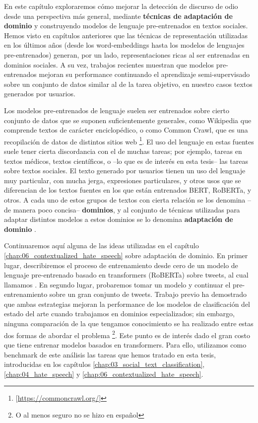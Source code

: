\label{chap:07_domain_adaptation}
\newcommand{\deacc}[0]{\textbf{deacc}}
\newcommand{\cased}[0]{\textbf{cased}}
\newcommand{\uncased}[0]{\textbf{uncased}}

En este capítulo exploraremos cómo mejorar la detección de discurso de odio desde una perspectiva más general, mediante \textbf{técnicas de adaptación de dominio} y construyendo modelos de lenguaje pre-entrenados en textos sociales. Hemos visto en capítulos anteriores que las técnicas de representación utilizadas en los últimos años (desde los word-embeddings hasta los modelos de lenguajes pre-entrenados) generan, por un lado, representaciones ricas al ser entrenadas en dominios sociales. A su vez, trabajos recientes muestran que modelos pre-entrenados mejoran su performance continuando el aprendizaje semi-supervisado sobre un conjunto de datos similar al de la tarea objetivo, en nuestro casos textos generados por usuarios.

Los modelos pre-entrenados de lenguaje suelen ser entrenados sobre cierto conjunto de datos que se suponen suficientemente generales, como Wikipedia que comprende textos de carácter enciclopédico, o como Common Crawl, que es una recopilación de datos de distintos sitios web \footnote{[\url{https://commoncrawl.org/}]}. El uso del lenguaje en estas fuentes suele tener cierta discordancia con el de muchas tareas; por ejemplo, tareas en textos médicos, textos científicos, o --lo que es de interés en esta tesis-- las tareas sobre textos sociales. El texto generado por usuarios tienen un uso del lenguaje muy particular, con mucha jerga, expresiones particulares, y otros usos que se diferencian de los textos fuentes en los que están entrenados BERT, RoBERTa, \beto{} y otros. A cada uno de estos grupos de textos con cierta relación se los denomina --de manera poco concisa-- \textbf{dominios}, y al conjunto de técnicas utilizadas para adaptar distintos modelos a estos dominios se lo denomina \textbf{adaptación de dominio} \cite{eisenstein2013bad}.

Continuaremos aquí alguna de las ideas utilizadas en el capítulo \ref{chap:06_contextualized_hate_speech} sobre adaptación de dominio. En primer lugar, describiremos el proceso de entrenamiento desde cero de un modelo de lenguaje pre-entrenado basado en transformers (RoBERTa) \cite{liu2019roberta} sobre tweets, al cual llamamos \robertuito{}. En segundo lugar, probaremos tomar un modelo \beto{} y continuar el pre-entrenamiento sobre un gran conjunto de tweets. Trabajo previo ha demostrado que ambas estrategias mejoran la performance de los modelos de clasificación del estado del arte cuando trabajamos en dominios especializados; sin embargo, ninguna comparación de la que tengamos conocimiento se ha realizado entre estas dos formas de abordar el problema \footnote{O al menos seguro no se hizo en español}. Este punto es de interés dado el gran costo que tiene entrenar modelos basados en transformers. Para ello, utilizamos como benchmark de este análisis las tareas que hemos tratado en esta tesis, introducidas en los capítulos \ref{chap:03_social_text_classification}, \ref{chap:04_hate_speech} y \ref{chap:06_contextualized_hate_speech}.


